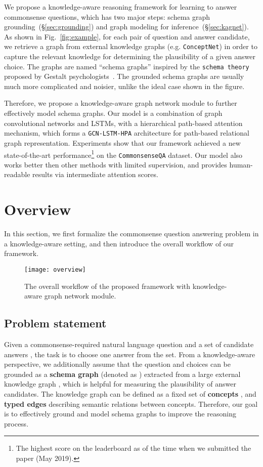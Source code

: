 \documentclass[11pt,a4paper]{article}
\newcommand{\secref}[1]{\S\ref{#1}}
\begin{document}
We propose a knowledge-aware reasoning framework for learning to answer commonsense questions, which has two major steps: schema graph grounding~(\secref{sec:grounding}) and graph modeling for inference~(\secref{sec:kagnet}).
As shown in Fig.~\ref{fig:example}, for each pair of question and answer candidate, we retrieve a graph from external knowledge graphs (e.g. \texttt{ConceptNet}) in order to capture the relevant knowledge for determining the plausibility of a given answer choice.
The graphs are named ``schema graphs'' inspired by the \texttt{schema theory} proposed by Gestalt psychologists~\cite{axelrod1973schema}.
The grounded schema graphs are usually much more complicated and noisier, unlike the ideal case shown in the figure. 

Therefore, we propose a knowledge-aware graph network module to further effectively model schema graphs.  
Our model \KagNet is a combination of graph convolutional networks \cite{kipf2016semi} and LSTMs, with a hierarchical path-based attention mechanism, which forms a \texttt{GCN-LSTM-HPA} architecture for path-based relational graph representation. 
Experiments show that our framework achieved a new state-of-the-art performance\footnote{The highest score on the leaderboard as of the time when we submitted the paper (May 2019).} on the \texttt{CommonsenseQA} dataset.
Our model also works better then other methods with limited supervision, and provides human-readable results via intermediate attention scores.



\section{Overview}
\label{sec:overview}
In this section, we first formalize the commonsense question answering  problem in a knowledge-aware setting, and then introduce the overall workflow of our framework. 
\begin{figure}
	\centering
	\texttt{[image: overview]}
	\caption{The overall workflow of the proposed framework with knowledge-aware graph network module.\vspace{0pt}}
	\label{fig:overviewlatex}
\end{figure}
\subsection{Problem statement}
Given a commonsense-required natural language question  and a set of  candidate answers , 
the task is to choose one answer from the set. 
From a knowledge-aware perspective, we additionally assume that the question  and choices  can be grounded as a \textbf{schema graph} (denoted as ) extracted from a large external {knowledge graph} , which is helpful for measuring the plausibility of answer candidates.
The knowledge graph  can be defined as a fixed set of \textbf{concepts} , and \textbf{typed edges}  describing semantic relations between concepts. 
Therefore, our goal is to effectively ground and model schema graphs to improve the reasoning process.
\end{document}

